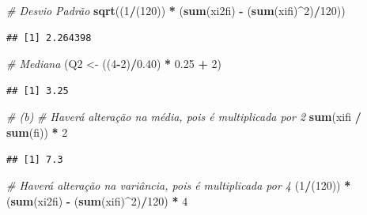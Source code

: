 \documentclass[]{article}
\newenvironment{Shaded}{\begin{snugshade}}{\end{snugshade}}
\newcommand{\KeywordTok}[1]{\textcolor[rgb]{0.13,0.29,0.53}{\textbf{#1}}}
\newcommand{\DecValTok}[1]{\textcolor[rgb]{0.00,0.00,0.81}{#1}}
\newcommand{\FloatTok}[1]{\textcolor[rgb]{0.00,0.00,0.81}{#1}}
\newcommand{\StringTok}[1]{\textcolor[rgb]{0.31,0.60,0.02}{#1}}
\newcommand{\CommentTok}[1]{\textcolor[rgb]{0.56,0.35,0.01}{\textit{#1}}}
\newcommand{\OperatorTok}[1]{\textcolor[rgb]{0.81,0.36,0.00}{\textbf{#1}}}
\newcommand{\NormalTok}[1]{#1}
\begin{document}
\begin{Shaded}
\begin{Highlighting}[]
\CommentTok{# Desvio Padrão}
\KeywordTok{sqrt}\NormalTok{((}\DecValTok{1}\OperatorTok{/}\NormalTok{(}\DecValTok{120}\NormalTok{)) }\OperatorTok{*}\StringTok{ }\NormalTok{(}\KeywordTok{sum}\NormalTok{(xi2fi) }\OperatorTok{-}\StringTok{ }\NormalTok{(}\KeywordTok{sum}\NormalTok{(xifi)}\OperatorTok{^}\DecValTok{2}\NormalTok{)}\OperatorTok{/}\DecValTok{120}\NormalTok{))}
\end{Highlighting}
\end{Shaded}

\begin{verbatim}
## [1] 2.264398
\end{verbatim}

\begin{Shaded}
\begin{Highlighting}[]
\CommentTok{# Mediana}
\NormalTok{(Q2 <-}\StringTok{ }\NormalTok{((}\DecValTok{4}\OperatorTok{-}\DecValTok{2}\NormalTok{)}\OperatorTok{/}\FloatTok{0.40}\NormalTok{) }\OperatorTok{*}\StringTok{ }\FloatTok{0.25} \OperatorTok{+}\StringTok{ }\DecValTok{2}\NormalTok{)}
\end{Highlighting}
\end{Shaded}

\begin{verbatim}
## [1] 3.25
\end{verbatim}

\begin{Shaded}
\begin{Highlighting}[]
\CommentTok{# (b)}
\CommentTok{# Haverá alteração na média, pois é multiplicada por 2}
\KeywordTok{sum}\NormalTok{(xifi }\OperatorTok{/}\StringTok{ }\KeywordTok{sum}\NormalTok{(fi)) }\OperatorTok{*}\StringTok{ }\DecValTok{2}
\end{Highlighting}
\end{Shaded}

\begin{verbatim}
## [1] 7.3
\end{verbatim}

\begin{Shaded}
\begin{Highlighting}[]
\CommentTok{# Haverá alteração na variância, pois é multiplicada por 4}
\NormalTok{(}\DecValTok{1}\OperatorTok{/}\NormalTok{(}\DecValTok{120}\NormalTok{)) }\OperatorTok{*}\StringTok{ }\NormalTok{(}\KeywordTok{sum}\NormalTok{(xi2fi) }\OperatorTok{-}\StringTok{ }\NormalTok{(}\KeywordTok{sum}\NormalTok{(xifi)}\OperatorTok{^}\DecValTok{2}\NormalTok{)}\OperatorTok{/}\DecValTok{120}\NormalTok{) }\OperatorTok{*}\StringTok{ }\DecValTok{4}
\end{Highlighting}
\end{Shaded}
\end{document}
